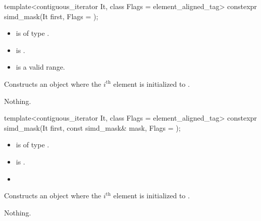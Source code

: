 \begin{itemdecl}
template<contiguous_iterator It, class Flags = element_aligned_tag>
  constexpr simd_mask(It first, Flags = {});
\end{itemdecl}

\begin{itemdescr}
  \pnum\constraints
  \begin{itemize}
    \item {} is of type .
    \item {} is .
  \end{itemize}

  \pnum\requires
  \begin{itemize}
    \item \tcode{[first, first + size())} is a valid range.
  \end{itemize}

  \pnum\effects
  Constructs an object where the $i^\text{th}$ element is initialized to  \foralli.

  \pnum\throws Nothing.
\end{itemdescr}

\begin{itemdecl}
template<contiguous_iterator It, class Flags = element_aligned_tag>
  constexpr simd_mask(It first, const simd_mask& mask, Flags = {});
\end{itemdecl}

\begin{itemdescr}
  \pnum\constraints
  \begin{itemize}
    \item {} is of type .
    \item {} is .
  \end{itemize}

  \pnum\requires
  \begin{itemize}
    \item \validMaskedRange
  \end{itemize}

  \pnum\effects
  Constructs an object where the $i^\text{th}$ element is initialized to  \foralli.

  \pnum\throws Nothing.
\end{itemdescr}

